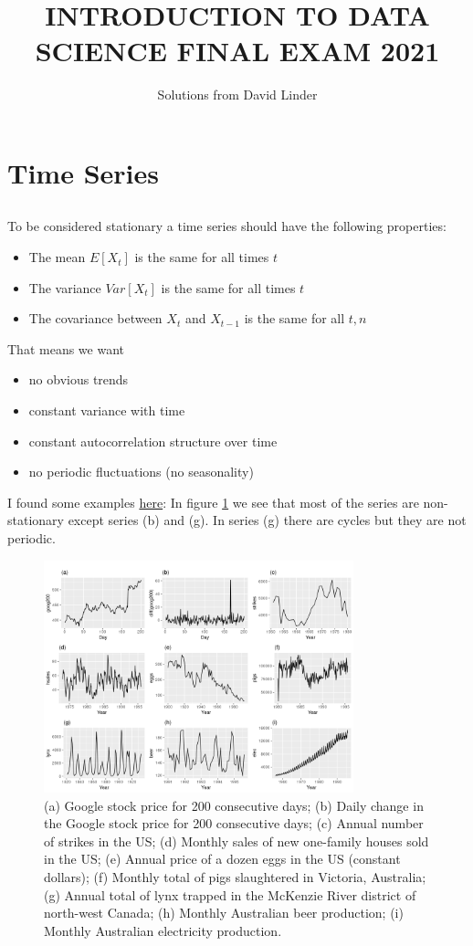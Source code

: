 \documentclass[]{article}
\title{\textbf{INTRODUCTION TO DATA SCIENCE FINAL EXAM 2021}}
\author{Solutions from David Linder}
\begin{document}
	\maketitle
	\thispagestyle{fancy}
	\section{Time Series}
	\subsection{}
	To be considered stationary a time series should have the following properties:
	\begin{itemize}
		\item The mean $E[X_t]$ is the same for all times $t$
		\item The variance $Var[X_t]$ is the same for all times $t$
		\item The covariance between $X_t$ and $X_{t-1}$ is the same for all $t, n$
	\end{itemize}
	That means we want
	\begin{itemize}
		\item no obvious trends
		\item constant variance with time
		\item constant autocorrelation structure over time
		\item no periodic fluctuations (no seasonality)
	\end{itemize}
	I found some examples \href{https://otexts.com/fpp2/stationarity.html}{here}: In figure \ref{fig:time_series} we see that most of the series are non-stationary except series (b) and (g). In series (g) there are cycles but they are not periodic. 
	\begin{figure}
		\centering
		\includegraphics[width=0.8\textwidth]{images/time_series.png}
		\caption{(a) Google stock price for 200 consecutive days; (b) Daily change in the Google stock price for 200 consecutive days; (c) Annual number of strikes in the US; (d) Monthly sales of new one-family houses sold in the US; (e) Annual price of a dozen eggs in the US (constant dollars); (f) Monthly total of pigs slaughtered in Victoria, Australia; (g) Annual total of lynx trapped in the McKenzie River district of north-west Canada; (h) Monthly Australian beer production; (i) Monthly Australian electricity production.}
		\label{fig:time_series}
	\end{figure}
	
\end{document}
